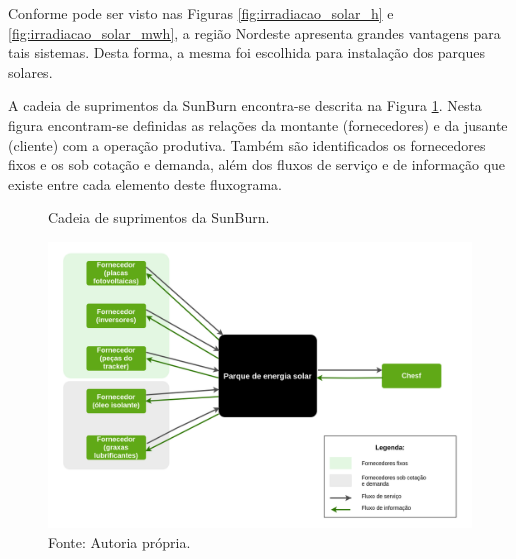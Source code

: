 Conforme pode ser visto nas Figuras \ref{fig:irradiacao_solar_h} e \ref{fig:irradiacao_solar_mwh}, a região Nordeste apresenta grandes vantagens para tais sistemas. Desta forma, a mesma foi escolhida para instalação dos parques solares.

A cadeia de suprimentos da SunBurn encontra-se descrita na Figura \ref{fig:cadeia_suprimentos_sunburn}. Nesta figura encontram-se definidas as relações da montante (fornecedores) e da jusante (cliente) com a operação produtiva. Também são identificados os fornecedores fixos e os sob cotação e demanda, além dos fluxos de serviço e de informação que existe entre cada elemento deste fluxograma.


\begin{figure}[H]
    \centering
    \caption{Cadeia de suprimentos da SunBurn.}
    \includegraphics[width = \textwidth]{images/cadeia_suprimentos_sunburn.png}
    \caption*{Fonte: Autoria própria.}
    \label{fig:cadeia_suprimentos_sunburn}
\end{figure}
